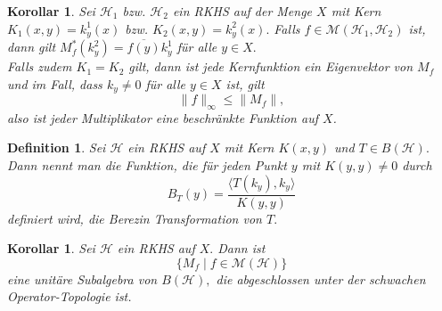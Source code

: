 \documentclass[12pt,titlepage,twoside,cleardoublepage]{article}
\theoremstyle{nummermitklammern}
\newtheorem{korollar}[temp]{Korollar}
\newtheorem{definition}[temp]{Definition}
\newtheorem{definition}[zahl]{Definition}
\numberwithin{equation}{section}
\newtheorem{korollar}[zahl]{Korollar}
\begin{document}
\begin{korollar}
Sei $\mathcal{H}_1$ bzw. $\mathcal{H}_2$ ein RKHS auf der Menge $X$ mit Kern $K_1(x,y)=k^1_y(x)$ bzw. $K_2(x,y)=k^2_y(x).$ Falls $f\in \mathcal{M}(\mathcal{H}_1,\mathcal{H}_2)$ ist, dann gilt $M^*_f(k^2_y)=\overline{f(y)}k_y^1$ für alle $ y\in X.$ \\
Falls zudem $K_1=K_2$ gilt, dann ist jede Kernfunktion ein Eigenvektor von $M_f$ und im Fall, dass $k_y\neq 0$ für alle $y\in X$ ist, gilt
\[
\|f\|_{\infty}\leq \|M_f\|,
\]
also ist jeder Multiplikator eine beschränkte Funktion auf $X$.
\end{korollar}

\begin{definition} 
Sei $\mathcal{H}$ ein RKHS auf $X$ mit Kern $K(x,y)$ und $T\in B(\mathcal{H}).$ Dann nennt man die Funktion, die für jeden Punkt $y$ mit $K(y,y)\neq 0$ durch
\[
B_T(y)=\frac{\langle T(k_y),k_y \rangle}{K(y,y)}
\]
 definiert wird, die \emph{Berezin Transformation} von $T.$
 \end{definition}
 
 \begin{korollar}
 Sei $\mathcal{H}$ ein RKHS auf $X.$ Dann ist 
 \[
\{M_f\mid f\in \mathcal{M}(\mathcal{H})\} 
 \]
 eine unitäre Subalgebra von $B(\mathcal{H}),$ die abgeschlossen unter der schwachen Operator-Topologie ist.
 \end{korollar}
\end{document}
